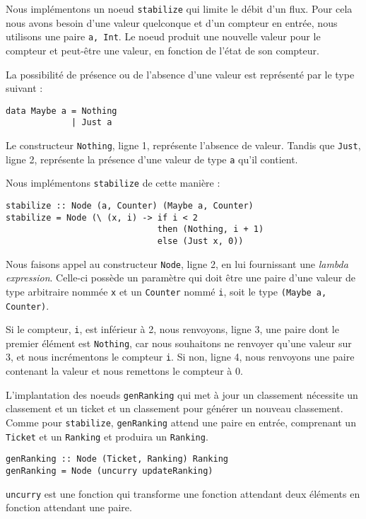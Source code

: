 \documentclass{llncs}
\begin{document}
Nous implémentons un noeud \lstinline{stabilize} qui limite le débit d'un flux.
Pour cela nous avons besoin d'une valeur quelconque et d'un compteur en entrée,
nous utilisons une paire \lstinline{a, Int}.
Le noeud produit une nouvelle valeur pour le compteur et peut-être une valeur,
en fonction de l'état de son compteur.

La possibilité de présence ou de l'absence d'une valeur est représenté par le type
suivant :

\begin{lstlisting}
data Maybe a = Nothing
             | Just a
\end{lstlisting}

Le constructeur \lstinline{Nothing}, ligne 1, représente l'absence de valeur.
Tandis que \lstinline{Just}, ligne 2, représente la présence d'une valeur de type
\lstinline{a} qu'il contient.

Nous implémentons \lstinline{stabilize} de cette manière :
\begin{lstlisting}
stabilize :: Node (a, Counter) (Maybe a, Counter)
stabilize = Node (\ (x, i) -> if i < 2
                              then (Nothing, i + 1)
                              else (Just x, 0))
\end{lstlisting}

Nous faisons appel au constructeur \lstinline{Node}, ligne 2, en lui fournissant
une \emph{lambda expression}.
Celle-ci possède un paramètre qui doit être une paire d'une valeur de type arbitraire
nommée \lstinline{x} et un \lstinline{Counter} nommé \lstinline{i}, soit le type
\lstinline{(Maybe a, Counter)}.

Si le compteur, \lstinline{i}, est inférieur à 2, nous renvoyons, ligne 3,
une paire dont le premier élément est \lstinline{Nothing}, car nous souhaitons
ne renvoyer qu'une valeur sur 3, et nous incrémentons le compteur \lstinline{i}.
Si non, ligne 4, nous renvoyons une paire contenant la valeur et nous remettons
le compteur à 0.

L'implantation des noeuds \lstinline{genRanking} qui met à jour un classement
nécessite un classement et un ticket et un classement pour générer un nouveau classement.
Comme pour \lstinline{stabilize}, \lstinline{genRanking} attend une paire en
entrée, comprenant un \lstinline{Ticket} et un \lstinline{Ranking} et produira
un \lstinline{Ranking}.
\begin{lstlisting}
genRanking :: Node (Ticket, Ranking) Ranking
genRanking = Node (uncurry updateRanking)
\end{lstlisting}
\lstinline{uncurry} est une fonction qui transforme une fonction attendant deux éléments
en fonction attendant une paire.
\end{document}
